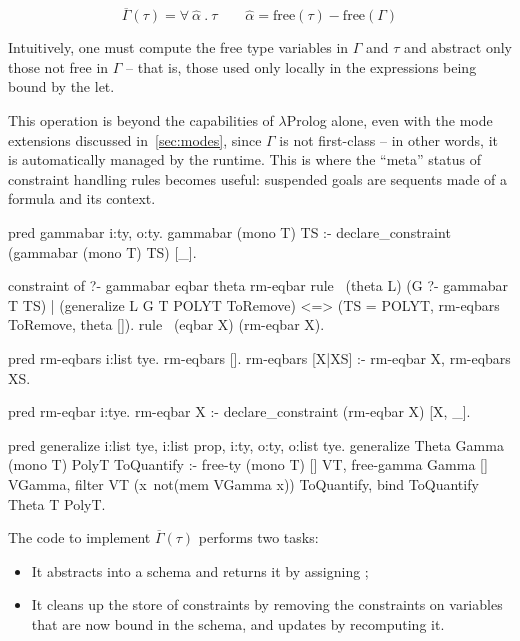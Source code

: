 \documentclass[a4paper, 11pt]{book}
\begin{document}
$$
\overline{\Gamma}(\tau) = \forall\ \hat{\alpha}\ .\ \tau \quad\quad \hat{\alpha} = \textrm{free}(\tau) - \textrm{free}(\Gamma)
$$

Intuitively, one must compute the free type variables in $\Gamma$ and $\tau$
and abstract only those not free in $\Gamma$ -- that is, those used only locally
in the expressions being bound by the let.

This operation is beyond the capabilities of $\lambda$Prolog alone, even with
the mode extensions discussed in~\cref{sec:modes}, since $\Gamma$ is not
first-class -- in other words, it is automatically managed by the runtime. This
is where the ``meta'' status of constraint handling rules becomes useful:
suspended goals are sequents made of a formula and its context.

\begin{elpicode}
pred gammabar i:ty, o:ty.
gammabar (mono T) TS :- declare_constraint (gammabar (mono T) TS) [_].

constraint of ?- gammabar eqbar theta rm-eqbar {
  rule  \ (theta L)
          (G ?- gammabar T TS)              %
        | (generalize L G T POLYT ToRemove) %
      <=> (TS = POLYT, rm-eqbars ToRemove, theta []). %
  rule \ (eqbar X) (rm-eqbar X).
}

pred rm-eqbars i:list tye.
rm-eqbars [].
rm-eqbars [X|XS] :- rm-eqbar X, rm-eqbars XS.

pred rm-eqbar i:tye.
rm-eqbar X :- declare_constraint (rm-eqbar X) [X, _].

pred generalize i:list tye, i:list prop, i:ty, o:ty, o:list tye.
generalize Theta Gamma (mono T) PolyT ToQuantify :-
  free-ty (mono T) [] VT,
  free-gamma Gamma [] VGamma,
  filter VT (x\ not(mem VGamma x)) ToQuantify,
  bind ToQuantify Theta T PolyT.
\end{elpicode}

\noindent
The code to implement $\overline{\Gamma}(\tau)$ performs two tasks:

\begin{itemize}
  \item It abstracts  into a schema  and returns it by
    assigning ;
  \item It cleans up the store of constraints by removing the 
    constraints on variables that are now bound in the schema, and updates
     by recomputing it.
\end{itemize}
\end{document}

